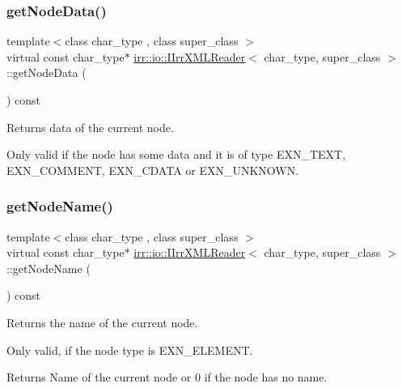 \subsubsection{\texorpdfstring{get\+Node\+Data()}{getNodeData()}}
{\footnotesize\ttfamily template$<$class char\+\_\+type , class super\+\_\+class $>$ \\
virtual const char\+\_\+type$\ast$ \hyperlink{classirr_1_1io_1_1IIrrXMLReader}{irr\+::io\+::\+I\+Irr\+X\+M\+L\+Reader}$<$ char\+\_\+type, super\+\_\+class $>$\+::get\+Node\+Data (\begin{DoxyParamCaption}{ }\end{DoxyParamCaption}) const\hspace{0.3cm}{\ttfamily [pure virtual]}}



Returns data of the current node. 

Only valid if the node has some data and it is of type E\+X\+N\+\_\+\+T\+E\+XT, E\+X\+N\+\_\+\+C\+O\+M\+M\+E\+NT, E\+X\+N\+\_\+\+C\+D\+A\+TA or E\+X\+N\+\_\+\+U\+N\+K\+N\+O\+WN. \mbox{\label{classirr_1_1io_1_1IIrrXMLReader_a7d745b130c895d0f910f191d04e20e87}} 
\subsubsection{\texorpdfstring{get\+Node\+Name()}{getNodeName()}}
{\footnotesize\ttfamily template$<$class char\+\_\+type , class super\+\_\+class $>$ \\
virtual const char\+\_\+type$\ast$ \hyperlink{classirr_1_1io_1_1IIrrXMLReader}{irr\+::io\+::\+I\+Irr\+X\+M\+L\+Reader}$<$ char\+\_\+type, super\+\_\+class $>$\+::get\+Node\+Name (\begin{DoxyParamCaption}{ }\end{DoxyParamCaption}) const\hspace{0.3cm}{\ttfamily [pure virtual]}}



Returns the name of the current node. 

Only valid, if the node type is E\+X\+N\+\_\+\+E\+L\+E\+M\+E\+NT. \begin{DoxyReturn}{Returns}
Name of the current node or 0 if the node has no name. 
\end{DoxyReturn}
\mbox{\label{classirr_1_1io_1_1IIrrXMLReader_a9af7e323c292a4836bf4a7c093b4d85a}} 
